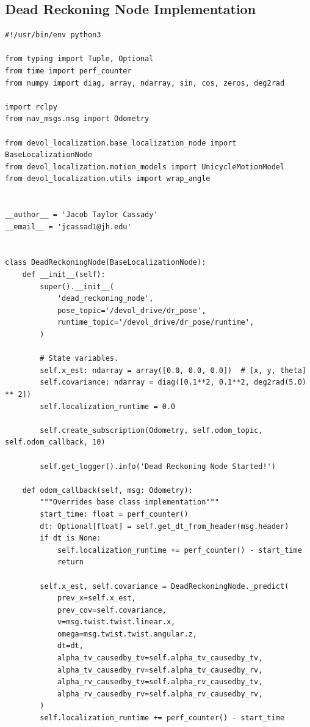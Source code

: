 \newpage
\subsection{Dead Reckoning Node Implementation}\label{subsec:DR implementation}
\begin{verbatim}
#!/usr/bin/env python3

from typing import Tuple, Optional
from time import perf_counter
from numpy import diag, array, ndarray, sin, cos, zeros, deg2rad

import rclpy
from nav_msgs.msg import Odometry

from devol_localization.base_localization_node import BaseLocalizationNode
from devol_localization.motion_models import UnicycleMotionModel
from devol_localization.utils import wrap_angle


__author__ = 'Jacob Taylor Cassady'
__email__ = 'jcassad1@jh.edu'


class DeadReckoningNode(BaseLocalizationNode):
    def __init__(self):
        super().__init__(
            'dead_reckoning_node',
            pose_topic='/devol_drive/dr_pose',
            runtime_topic='/devol_drive/dr_pose/runtime',
        )

        # State variables.
        self.x_est: ndarray = array([0.0, 0.0, 0.0])  # [x, y, theta]
        self.covariance: ndarray = diag([0.1**2, 0.1**2, deg2rad(5.0) ** 2])
        self.localization_runtime = 0.0

        self.create_subscription(Odometry, self.odom_topic, self.odom_callback, 10)

        self.get_logger().info('Dead Reckoning Node Started!')

    def odom_callback(self, msg: Odometry):
        """Overrides base class implementation"""
        start_time: float = perf_counter()
        dt: Optional[float] = self.get_dt_from_header(msg.header)
        if dt is None:
            self.localization_runtime += perf_counter() - start_time
            return

        self.x_est, self.covariance = DeadReckoningNode._predict(
            prev_x=self.x_est,
            prev_cov=self.covariance,
            v=msg.twist.twist.linear.x,
            omega=msg.twist.twist.angular.z,
            dt=dt,
            alpha_tv_causedby_tv=self.alpha_tv_causedby_tv,
            alpha_tv_causedby_rv=self.alpha_tv_causedby_rv,
            alpha_rv_causedby_tv=self.alpha_rv_causedby_tv,
            alpha_rv_causedby_rv=self.alpha_rv_causedby_rv,
        )
        self.localization_runtime += perf_counter() - start_time


\end{verbatim}
